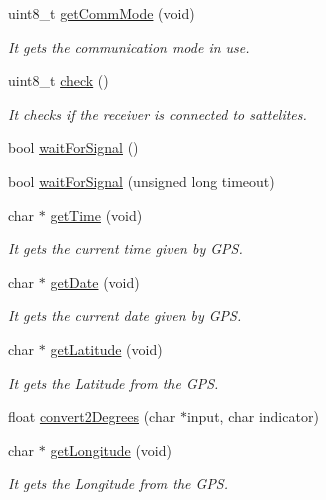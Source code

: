 \begin{DoxyCompactItemize}
uint8\+\_\+t \hyperlink{class_wasp_g_p_s_a121d4b15f3c1a583527a2612a6690604}{get\+Comm\+Mode} (void)
\begin{DoxyCompactList}\small\item\em It gets the communication mode in use. \end{DoxyCompactList}\item 
uint8\+\_\+t \hyperlink{class_wasp_g_p_s_a2ec8ddef6843d3c4b74dfbdd8bfab605}{check} ()
\begin{DoxyCompactList}\small\item\em It checks if the receiver is connected to sattelites. \end{DoxyCompactList}\item 
bool \hyperlink{class_wasp_g_p_s_a4874231d2959a49ae536c0fe5fdbc5d5}{wait\+For\+Signal} ()
\item 
bool \hyperlink{class_wasp_g_p_s_aa23959c501ca0af5ee0cfa2320b3a4a9}{wait\+For\+Signal} (unsigned long timeout)
\item 
char $\ast$ \hyperlink{class_wasp_g_p_s_a391c6f99505c32663fc5abf887727b2a}{get\+Time} (void)
\begin{DoxyCompactList}\small\item\em It gets the current time given by G\+PS. \end{DoxyCompactList}\item 
char $\ast$ \hyperlink{class_wasp_g_p_s_ae684a06bd7d0817f953f8caf14e23ed5}{get\+Date} (void)
\begin{DoxyCompactList}\small\item\em It gets the current date given by G\+PS. \end{DoxyCompactList}\item 
char $\ast$ \hyperlink{class_wasp_g_p_s_a8ea90739d315b574238ba5740d5a64d5}{get\+Latitude} (void)
\begin{DoxyCompactList}\small\item\em It gets the Latitude from the G\+PS. \end{DoxyCompactList}\item 
float \hyperlink{class_wasp_g_p_s_a53058a6576140e56b6196a7203b8bbfe}{convert2\+Degrees} (char $\ast$input, char indicator)
\item 
char $\ast$ \hyperlink{class_wasp_g_p_s_a6c3ccd0b879dca13d186f3d842f0bb89}{get\+Longitude} (void)
\begin{DoxyCompactList}\small\item\em It gets the Longitude from the G\+PS. \end{DoxyCompactList}\item 

\end{DoxyCompactItemize}
